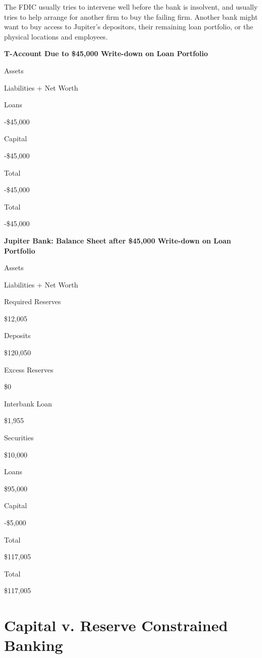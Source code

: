 \documentclass[
]{book}
\begin{document}
The FDIC usually tries to intervene well before the bank is insolvent, and usually tries to help arrange for another firm to buy the failing firm. Another bank might want to buy access to Jupiter's depositors, their remaining loan portfolio, or the physical locations and employees.

\label{tab:t26}\textbf{T-Account Due to \$45,000 Write-down on Loan Portfolio}

Assets

Liabilities + Net Worth

Loans

-\$45,000

Capital

-\$45,000

Total

-\$45,000

Total

-\$45,000

\label{tab:t27}\textbf{Jupiter Bank: Balance Sheet after \$45,000 Write-down on Loan Portfolio}

Assets

Liabilities + Net Worth

Required Reserves

\$12,005

Deposits

\$120,050

Excess Reserves

\$0

Interbank Loan

\$1,955

Securities

\$10,000

Loans

\$95,000

Capital

-\$5,000

Total

\$117,005

Total

\$117,005

\hypertarget{capital-v.-reserve-constrained-banking}{%
\section{Capital v. Reserve Constrained Banking}\label{capital-v.-reserve-constrained-banking}}
\end{document}
